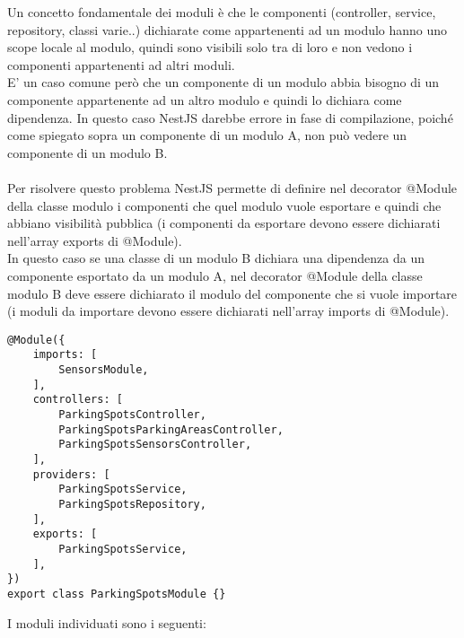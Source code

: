 Un concetto fondamentale dei moduli è che le componenti (controller, service, repository, classi varie..) dichiarate 
come appartenenti ad un modulo hanno uno scope locale al modulo, quindi sono visibili solo tra di loro e non vedono
i componenti appartenenti ad altri moduli.
\\
E' un caso comune però che un componente di un modulo abbia bisogno di un componente appartenente ad un altro modulo
e quindi lo dichiara come dipendenza. In questo caso NestJS darebbe errore in fase di compilazione, poiché come 
spiegato sopra un componente di un modulo A, non può vedere un componente di un modulo B.
\\\\
Per risolvere questo problema NestJS permette di definire nel decorator @Module della classe modulo i componenti che
quel modulo vuole esportare e quindi che abbiano visibilità pubblica (i componenti da esportare devono essere dichiarati 
nell'array exports di @Module). 
\\
In questo caso se una classe di un modulo B dichiara una 
dipendenza da un componente esportato da un modulo A, nel decorator @Module della classe modulo B deve essere dichiarato il
modulo del componente che si vuole importare (i moduli da importare devono essere dichiarati nell'array imports di @Module).
\\
\begin{lstlisting}
@Module({
    imports: [ 
        SensorsModule,
    ],
    controllers: [
        ParkingSpotsController, 
        ParkingSpotsParkingAreasController,
        ParkingSpotsSensorsController,
    ],
    providers: [
        ParkingSpotsService,
        ParkingSpotsRepository,
    ],
    exports: [
        ParkingSpotsService,
    ],
})
export class ParkingSpotsModule {}
\end{lstlisting}
\leavevmode\newline
I moduli individuati sono i seguenti:
